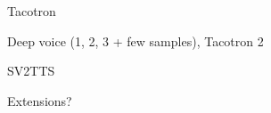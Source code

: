 \documentclass[a4paper, oneside]{article}
\begin{document}
Tacotron

Deep voice (1, 2, 3 + few samples), Tacotron 2

SV2TTS

Extensions?
\color{black}



\color{red}
\color{black}

\clearpage

 


























\end{document}
